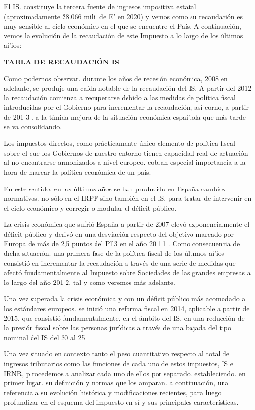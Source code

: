 \documentclass[10pt,a4paper]{article}
\begin{document}
El IS. constituye la tercera fuente de ingresos impositiva estatal (aproximadamente 28.066 mili. de E' en 2020) y vemos como su recaudación es muy sensible al ciclo económico en el que se encuentre el País. A continuación, vemos la evolución de la recaudación de este Impuesto a lo largo de los últimos ai'ios:

\textbf{TABLA DE RECAUDACIÓN IS}

Como podernos observar. durante los años de recesión económica, 2008 en adelante, se produjo una caída notable de la recaudación del IS. A partir del 2012 la recaudación comienza a recuperarse debido a las medidas de política fiscal introducidas por el Gobierno para incrementar la recaudación, así corno, a partir de 201 3 . a la tímida mejora de la situación económica espai'iola que más tarde se va consolidando.

Los impuestos directos, como prácticamente único elemento de política fiscal sobre el que los Gobiernos de nuestro entorno tienen capacidad real de actuación al no encontrarse armonizados a nivel europeo. cobran especial importancia a la hora de marcar la política económica de un país.

En este sentido. en los últimos años se han producido en España cambios normativos. no sólo en el IRPF sino también en el IS. para tratar de intervenir en el ciclo económico y corregir o modular el déficit público.

La crisis económica que sufrió España a partir de 2007 elevó exponencialmente el déficit público y derivó en una desviación respecto del objetivo marcado por Europa de más de 2,5 puntos del Pll3 en el año 20 l 1 . Como consecuencia de dicha situación. una primera fase de la política fiscal de los últimos aí'íos consistió en incrementar la recaudación a través de una serie de medidas que afectó fundamentalmente al Impuesto sobre Sociedades de las grandes empresas a lo largo del año 201 2. tal y como veremos más adelante.

Una vez superada la crisis económica y con un déficit público más acomodado a los estándares europeos. se inició una reforma fiscal en 2014, aplicable a partir de 2015, que consistió fundamentalmente. en el ámbito del IS, en una reducción de la presión fiscal sobre las personas jurídicas a través de una bajada del tipo nominal del IS del 30 al 25%

Una vez situado en contexto tanto el peso cuantitativo respecto al total de ingresos tributarios como las funciones de cada uno de estos impuestos, IS e IRNR, p rocedemos a analizar cada uno de ellos por separado. estableciendo. en primer lugar. su definición y normas que los amparan. a continuación, una referencia a su evolución histórica y modificaciones recientes, para luego profundizar en el esquema del impuesto en sí y sus principales características.
\end{document}
